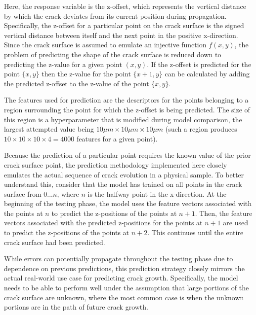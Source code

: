 Here, the response variable is the z-offset, which represents the vertical distance by which the crack deviates from its current position during propagation.  Specifically, the z-offset for a particular point on the crack surface is the signed vertical distance between itself and the next point in the positive x-direction.  Since the crack surface is assumed to emulate an injective function $f(x, y)$, the problem of predicting the shape of the crack surface is reduced down to predicting the z-value for a given point $(x, y)$.  If the z-offset is predicted for the point $\{x, y\}$ then the z-value for the point $\{x + 1, y\}$ can be calculated by adding the predicted z-offset to the z-value of the point $\{x, y\}$.

The features used for prediction are the descriptors for the points belonging to a region surrounding the point for which the z-offset is being predicted.  The size of this region is a hyperparameter that is modified during model comparison, the largest attempted value being $10 \mu m \times 10 \mu m \times 10 \mu m$ (such a region produces $10 \times 10 \times 10 \times 4 = 4000$ features for a given point).

Because the prediction of a particular point requires the known value of the prior crack surface point, the prediction methodology implemented here closely emulates the actual sequence of crack evolution in a physical sample.  To better understand this, consider that the model has trained on all points in the crack surface from $0 ... n$, where $n$ is the halfway point in the x-direction.  At the beginning of the testing phase, the model uses the feature vectors associated with the points at $n$ to predict the z-positions of the points at $n + 1$.  Then, the feature vectors associated with the predicted z-positions for the points at $n + 1$ are used to predict the z-positions of the points at $n + 2$.  This continues until the entire crack surface had been predicted.

While errors can potentially propagate throughout the testing phase due to dependence on previous predictions, this prediction strategy closely mirrors the actual real-world use case for predicting crack growth.  Specifically, the model needs to be able to perform well under the assumption that large portions of the crack surface are unknown, where the most common case is when the unknown portions are in the path of future crack growth.

